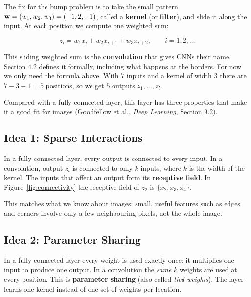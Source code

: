 \documentclass[12pt, a4paper]{article}
\begin{document}
The fix for the bump problem is to take the small pattern
$\mathbf{w} = (w_1, w_2, w_3) = (-1, 2, -1)$, called a \textbf{kernel} (or
\textbf{filter}), and slide it along the input. At each position we compute
one weighted sum:
\begin{resultbox}
  \[
    z_i = w_1 x_i + w_2 x_{i+1} + w_3 x_{i+2},
    \qquad i = 1, 2, \dots
  \]
\end{resultbox}
This sliding weighted sum is the \textbf{convolution} that gives CNNs their
name. Section 4.2 defines it formally, including what happens at the borders.
For now we only need the formula above. With $7$ inputs and a kernel of width
$3$ there are $7 - 3 + 1 = 5$ positions, so we get $5$ outputs
$z_1, \dots, z_5$.

Compared with a fully connected layer, this layer has three properties that
make it a good fit for images (Goodfellow et al., \emph{Deep Learning},
Section 9.2).

\subsection{Idea 1: Sparse Interactions}

In a fully connected layer, every output is connected to every input. In a
convolution, output $z_i$ is connected to only $k$ inputs, where $k$ is the
width of the kernel. The inputs that affect an output form its
\textbf{receptive field}. In Figure~\ref{fig:connectivity} the receptive field
of $z_2$ is $\{x_2, x_3, x_4\}$.

This matches what we know about images: small, useful features such as edges
and corners involve only a few neighbouring pixels, not the whole image.

\subsection{Idea 2: Parameter Sharing}

In a fully connected layer every weight is used exactly once: it multiplies one
input to produce one output. In a convolution the \emph{same} $k$ weights are
used at every position. This is \textbf{parameter sharing} (also called
\emph{tied weights}). The layer learns one kernel instead of one set of
weights per location.
\end{document}
